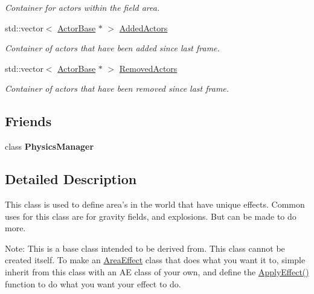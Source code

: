 \begin{DoxyCompactItemize}
\begin{DoxyCompactList}\small\item\em Container for actors within the field area. \item\end{DoxyCompactList}\item 
\hypertarget{classphys_1_1AreaEffect_a5bd2ad15db98ecc140a8bf2fee8d0c1f}{
std::vector$<$ \hyperlink{classphys_1_1ActorBase}{ActorBase} $\ast$ $>$ \hyperlink{classphys_1_1AreaEffect_a5bd2ad15db98ecc140a8bf2fee8d0c1f}{AddedActors}}
\label{d4/d55/classphys_1_1AreaEffect_a5bd2ad15db98ecc140a8bf2fee8d0c1f}

\begin{DoxyCompactList}\small\item\em Container of actors that have been added since last frame. \item\end{DoxyCompactList}\item 
\hypertarget{classphys_1_1AreaEffect_a1b1b6cced61ead4d6de3d8bad5c2125a}{
std::vector$<$ \hyperlink{classphys_1_1ActorBase}{ActorBase} $\ast$ $>$ \hyperlink{classphys_1_1AreaEffect_a1b1b6cced61ead4d6de3d8bad5c2125a}{RemovedActors}}
\label{d4/d55/classphys_1_1AreaEffect_a1b1b6cced61ead4d6de3d8bad5c2125a}

\begin{DoxyCompactList}\small\item\em Container of actors that have been removed since last frame. \item\end{DoxyCompactList}\end{DoxyCompactItemize}
\subsection*{Friends}
\begin{DoxyCompactItemize}
\item 
\hypertarget{classphys_1_1AreaEffect_a139cf05ac01161b7071c8a037c841683}{
class {\bfseries PhysicsManager}}
\label{d4/d55/classphys_1_1AreaEffect_a139cf05ac01161b7071c8a037c841683}

\end{DoxyCompactItemize}


\subsection{Detailed Description}
This class is used to define area's in the world that have unique effects. Common uses for this class are for gravity fields, and explosions. But can be made to do more. \par
 Note: This is a base class intended to be derived from. This class cannot be created itself. To make an \hyperlink{classphys_1_1AreaEffect}{AreaEffect} class that does what you want it to, simple inherit from this class with an AE class of your own, and define the \hyperlink{classphys_1_1AreaEffect_a3b285ecfcf9c9200662d510e48dd222a}{ApplyEffect()} function to do what you want your effect to do. 

